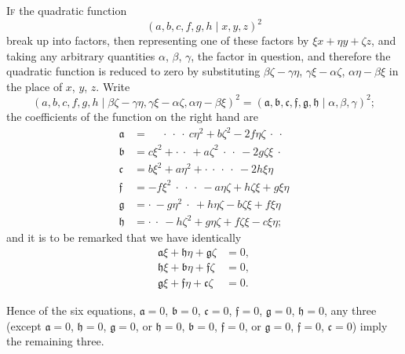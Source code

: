 \documentclass[11pt]{article}
\begin{document}
\medskip

\textsc{If} the quadratic function
\[
(a,b,c,f,g,h\mid x,y,z)^{2}
\]
break up into factors, then representing one of these factors by $\xi x+\eta y+\zeta z$, and taking any arbitrary quantities $\alpha$, $\beta$, $\gamma$, the factor in question, and therefore the quadratic function is reduced to zero by substituting $\beta\zeta-\gamma\eta$, $\gamma\xi-\alpha\zeta$, $\alpha\eta-\beta\xi$ in the place of $x$, $y$, $z$. Write
\[
(a,b,c,f,g,h\mid \beta\zeta-\gamma\eta,\gamma\xi-\alpha\zeta,\alpha\eta-\beta\xi)^{2} = (\mathfrak{a},\mathfrak{b},\mathfrak{c},\mathfrak{f},\mathfrak{g},\mathfrak{h}\mid \alpha,\beta,\gamma)^{2};
\]
the coefficients of the function on the right hand are
\[
\begin{aligned}
\mathfrak{a} &= \phantom{-}\cdot\ \cdot\ \cdot\ c\eta^{2} + b\zeta^{2} - 2f\eta\zeta\ \cdot\ \cdot\\
\mathfrak{b} &= c\xi^{2} + \cdot\ \cdot\ + a\zeta^{2}\ \cdot\ \cdot\ - 2g\zeta\xi\ \cdot\\
\mathfrak{c} &= b\xi^{2} + a\eta^{2} + \cdot\ \cdot\ \cdot\ \cdot\ -2h\xi\eta\\
\mathfrak{f} &= -f\xi^{2}\ \cdot\ \cdot\ \cdot\ -a\eta\zeta + h\zeta\xi + g\xi\eta\\
\mathfrak{g} &= \cdot\ -g\eta^{2}\ \cdot\ + h\eta\zeta - b\zeta\xi + f\xi\eta\\
\mathfrak{h} &= \cdot\ \cdot\ -h\zeta^{2} + g\eta\zeta + f\zeta\xi - c\xi\eta;
\end{aligned}
\]
and it is to be remarked that we have identically
\[
\begin{aligned}
\mathfrak{a}\xi + \mathfrak{h}\eta + \mathfrak{g}\zeta &= 0,\\
\mathfrak{h}\xi + \mathfrak{b}\eta + \mathfrak{f}\zeta &= 0,\\
\mathfrak{g}\xi + \mathfrak{f}\eta + \mathfrak{c}\zeta &= 0.
\end{aligned}
\]

Hence of the six equations, $\mathfrak{a}=0$, $\mathfrak{b}=0$, $\mathfrak{c}=0$, $\mathfrak{f}=0$, $\mathfrak{g}=0$, $\mathfrak{h}=0$, any three (except $\mathfrak{a}=0$, $\mathfrak{h}=0$, $\mathfrak{g}=0$, or $\mathfrak{h}=0$, $\mathfrak{b}=0$, $\mathfrak{f}=0$, or $\mathfrak{g}=0$, $\mathfrak{f}=0$, $\mathfrak{c}=0$) imply the remaining three.

\clearpage
\end{document}

